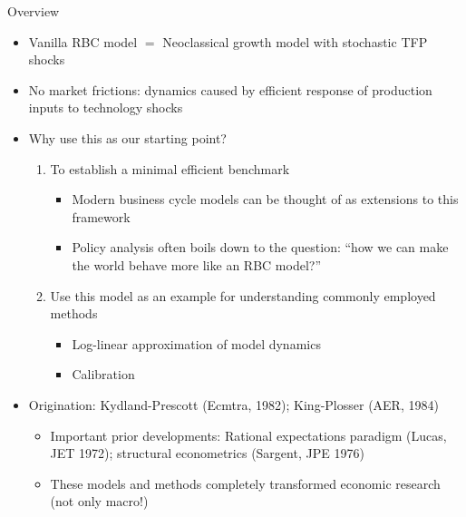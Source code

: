 \documentclass[9pt,xcolor={dvipsnames}]{beamer}
\newcommand{\bit}{\begin{itemize}}
\newcommand{\eit}{\end{itemize}}
\newcommand{\ben}{\begin{enumerate}}
\newcommand{\een}{\end{enumerate}}
\begin{document}
\begin{frame}{Overview}

\bit
\setlength\itemsep{1.5em}

\item Vanilla RBC model $=$ Neoclassical growth model with stochastic TFP shocks

\item No market frictions: dynamics caused by efficient response of production inputs to technology shocks

\item Why use this as our starting point?
\ben
	\setlength\itemsep{0.5em}
	\item To establish a minimal efficient benchmark
	\bit
		\item Modern business cycle models can be thought of as extensions to this framework 
		
		\item Policy analysis often boils down to the question: ``how we can make the world behave more like an RBC model?''
	\eit
	
	\item Use this model as an example for understanding commonly employed methods
		\bit
			\item Log-linear approximation of model dynamics
			
			\item Calibration
		\eit
\een 

\item Origination: Kydland-Prescott (Ecmtra, 1982); King-Plosser (AER, 1984)
\bit
\setlength\itemsep{0.5em}
	\item Important prior developments: Rational expectations paradigm (Lucas, JET 1972); structural econometrics (Sargent, JPE 1976)
	
	\item These models and methods completely transformed economic research (not only macro!)
\eit

\eit

\end{frame}
\end{document}
